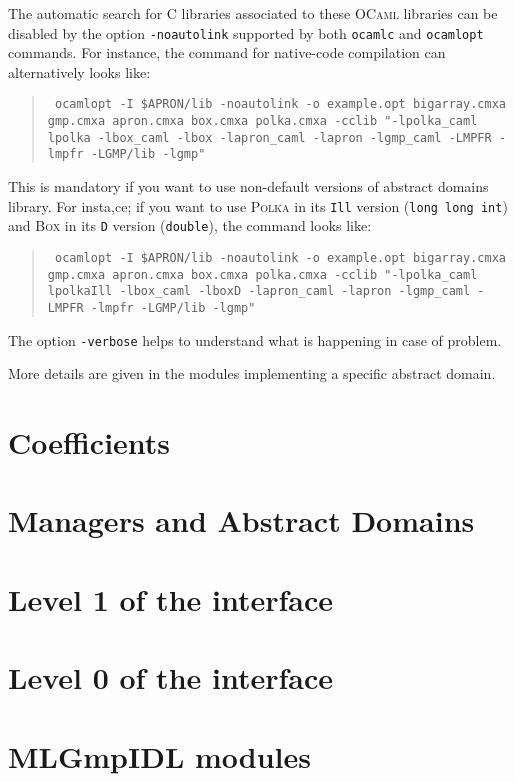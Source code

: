 \documentclass[twoside,10pt,a4paper]{report}
\begin{document}
The automatic search for C libraries associated to these
\textsc{OCaml} libraries can be disabled by the option
\texttt{-noautolink} supported by both \texttt{ocamlc} and
\texttt{ocamlopt} commands. For instance, the command for native-code compilation can alternatively looks like:
\begin{quote}\tt
  ocamlopt -I \$APRON/lib -noautolink -o example.opt bigarray.cmxa gmp.cmxa apron.cmxa box.cmxa polka.cmxa -cclib "-lpolka\_caml lpolka -lbox\_caml -lbox -lapron\_caml -lapron -lgmp\_caml -LMPFR -lmpfr -LGMP/lib -lgmp"
\end{quote}
This is mandatory if you want to use non-default versions of abstract domains library. For insta,ce; if you want to use \textsc{Polka} in its \texttt{Ill} version (\texttt{long long int}) and \textsc{Box} in its \texttt{D} version (\texttt{double}), the command looks like:
\begin{quote}\tt
  ocamlopt -I \$APRON/lib -noautolink -o example.opt bigarray.cmxa gmp.cmxa apron.cmxa box.cmxa polka.cmxa -cclib "-lpolka\_caml lpolkaIll -lbox\_caml -lboxD -lapron\_caml -lapron -lgmp\_caml -LMPFR -lmpfr -LGMP/lib -lgmp"
\end{quote}

The option \texttt{-verbose} helps to understand what is happening
in case of problem.

More details are given in the modules implementing a specific
abstract domain.

\part{Coefficients}




\part{Managers and Abstract Domains}







\part{Level 1 of the interface}










\part{Level 0 of the interface}








\part{MLGmpIDL modules}








\appendix
\printindex
\end{document}
